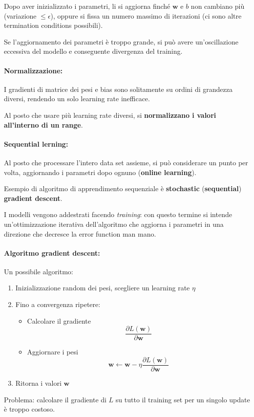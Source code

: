Dopo aver inizializzato i parametri, li si aggiorna finché $\bm w$ e $b$ non cambiano più (variazione $\leq \epsilon$), oppure si fissa un numero massimo di iterazioni (ci sono altre termination conditions possibili).

Se l'aggiornamento dei parametri è troppo grande, si può avere un'oscillazione eccessiva del modello e conseguente divergenza del training.

\paragraph{Normalizzazione:} I gradienti di matrice dei pesi e bias sono solitamente su ordini di grandezza diversi, rendendo un solo learning rate inefficace. 

Al posto che usare più learning rate diversi, si \textbf{normalizzano i valori all'interno di un range}.

\paragraph{Sequential lerning:} Al posto che processare l'intero data set assieme, si può considerare un punto per volta, aggiornando i parametri dopo ognuno (\textbf{online learning}).

Esempio di algoritmo di apprendimento sequenziale è \textbf{stochastic} (\textbf{sequential}) \textbf{gradient descent}. 

I modelli vengono addestrati facendo \textit{training}: con questo termine si intende un'ottimizzazione iterativa dell'algoritmo che aggiorna i parametri in una direzione che decresce la error function man mano.

\paragraph{Algoritmo gradient descent:} Un possibile algoritmo:
\begin{enumerate}
    \item Inizializzazione random dei pesi, scegliere un learning rate $\eta$
    
    \item Fino a convergenza ripetere:
    \begin{itemize}
        \item Calcolare il gradiente
        $$ \frac{\partial L (\bm w)}{\partial \bm w} $$
        
        \item Aggiornare i pesi
        $$ \bm w \leftarrow \bm w - \eta \frac{\partial L (\bm w)}{\partial \bm w} $$
    \end{itemize}
    
    \item Ritorna i valori $\bm w$
\end{enumerate}
Problema: calcolare il gradiente di $L$ su tutto il training set per un singolo update è troppo costoso.

